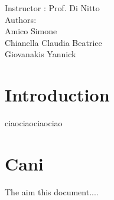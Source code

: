 \documentclass[11pt]{article}
\begin{document}
	 \begin{center}
	 	{\Large Instructor : Prof. Di Nitto}
	 	\vspace{5mm}\\	 
	 	{\Large Authors:}\\
	 	{\Large Amico Simone}\\
	 	{\Large Chianella Claudia Beatrice}\\
	 	{\Large Giovanakis Yannick}
	 \end{center}
	 
	 \newpage
	 
	 \tableofcontents{}
	 
	 \newpage
	 \section{\Large Introduction}
	 	ciaociaociaociao
	 \section{\Large Cani}
	 The aim this document....
	 
     
    
     
	
\end{document}
